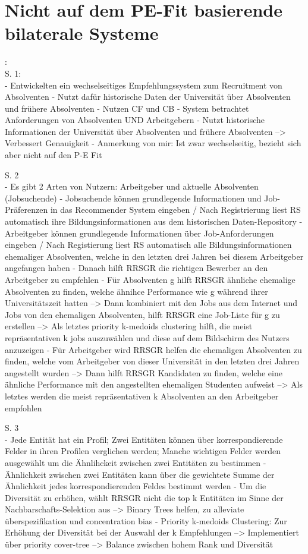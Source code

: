 \textcite{ding:2016}

\section{Nicht auf dem PE-Fit basierende bilaterale Systeme}
\label{ch:verwandteArbeiten:nichtAufDemPEFitBasierendeBilateraleSysteme}
 

\newpage
\textcite{ding:2016}:\\
S. 1:\\
- Entwickelten ein wechselseitiges Empfehlungssystem zum Recruitment von Absolventen
- Nutzt dafür historische Daten der Universität über Absolventen und frühere Absolventen
- Nutzen CF und CB
- System betrachtet Anforderungen von Absolventen UND Arbeitgebern
- Nutzt historische Informationen der Universität über Absolventen und frühere Absolventen --> Verbessert Genauigkeit
- Anmerkung von mir: Ist zwar wechselseitig, bezieht sich aber nicht auf den P-E Fit

S. 2\\
- Es gibt 2 Arten von Nutzern: Arbeitgeber und aktuelle Absolventen (Jobsuchende)
- Jobsuchende können grundlegende Informationen und Job-Präferenzen in das Recommender System eingeben / Nach Registrierung liest RS automatisch ihre Bildungsinformationen aus dem historischen Daten-Repository
- Arbeitgeber können grundlegende Informationen über Job-Anforderungen eingeben / Nach Registierung liest RS automatisch alle Bildungsinformationen ehemaliger Absolventen, welche in den letzten drei Jahren bei diesem Arbeitgeber angefangen haben
- Danach hilft RRSGR die richtigen Bewerber an den Arbeitgeber zu empfehlen
- Für Absolventen g hilft RRSGR ähnliche ehemalige Absolventen zu finden, welche ähnihce Performance wie g während ihrer Universitätszeit hatten --> Dann kombiniert mit den Jobs aus dem Internet und Jobs von den ehemaligen Absolventen, hilft RRSGR eine Job-Liste für g zu erstellen --> Als letztes priority k-medoids clustering hilft, die meist repräsentativen k jobs auszuwählen und diese auf dem Bildschirm des Nutzers anzuzeigen
- Für Arbeitgeber wird RRSGR helfen die ehemaligen Absolventen zu finden, welche vom Arbeitgeber von dieser Universität in den letzten drei Jahren angestellt wurden --> Dann hilft RRSGR Kandidaten zu finden, welche eine ähnliche Performance mit den angestellten ehemaligen Studenten aufweist --> Als letztes werden die meist repräsentativen k Absolventen an den Arbeitgeber empfohlen

S. 3\\
- Jede Entität hat ein Profil; Zwei Entitäten können über korrespondierende Felder in ihren Profilen verglichen werden; Manche wichtigen Felder werden ausgewählt um die Ähnlihckeit zwischen zwei Entitäten zu bestimmen
- Ähnlichkeit zwischen zwei Entitäten kann über die gewichtete Summe der Ähnlichkeit jedes korrespondierenden Feldes bestimmt werden
- Um die Diversität zu erhöhen, wählt RRSGR nicht die top k Entitäten im Sinne der Nachbarschafts-Selektion aus --> Binary Trees helfen, zu alleviate überspezifikation und concentration bias
- Priority k-medoids Clustering: Zur Erhöhung der Diversität bei der Auswahl der k Empfehlungen --> Implementiert über priority cover-tree --> Balance zwischen hohem Rank und Diversität

